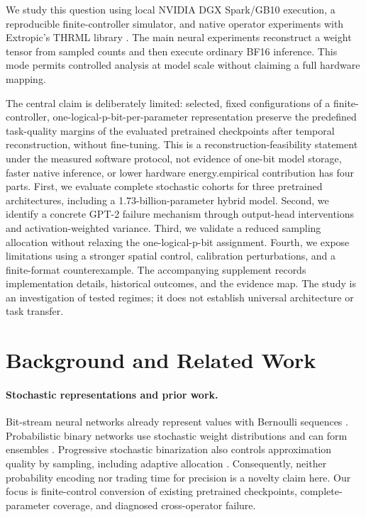 \documentclass[11pt]{article}
\begin{document}
We study this question using local NVIDIA DGX Spark/GB10 execution, a reproducible finite-controller simulator, and native operator experiments with Extropic's THRML library \citep{thrml}. The main neural experiments reconstruct a weight tensor from sampled counts and then execute ordinary BF16 inference. This mode permits controlled analysis at model scale without claiming a full hardware mapping.

The central claim is deliberately limited: selected, fixed configurations of a finite-controller, one-logical-p-bit-per-parameter representation preserve the predefined task-quality margins of the evaluated pretrained checkpoints after temporal reconstruction, without fine-tuning. This is a reconstruction-feasibility statement under the measured software protocol, not evidence of one-bit model storage, faster native inference, or lower hardware energy.\n\nThe empirical contribution has four parts. First, we evaluate complete stochastic cohorts for three pretrained architectures, including a 1.73-billion-parameter hybrid model. Second, we identify a concrete GPT-2 failure mechanism through output-head interventions and activation-weighted variance. Third, we validate a reduced sampling allocation without relaxing the one-logical-p-bit assignment. Fourth, we expose limitations using a stronger spatial control, calibration perturbations, and a finite-format counterexample. The accompanying supplement records implementation details, historical outcomes, and the evidence map. The study is an investigation of tested regimes; it does not establish universal architecture or task transfer.

\section{Background and Related Work}
\paragraph{Stochastic representations and prior work.}
Bit-stream neural networks already represent values with Bernoulli sequences \citep{shawe1995}. Probabilistic binary networks use stochastic weight distributions and can form ensembles \citep{peters2018}. Progressive stochastic binarization also controls approximation quality by sampling, including adaptive allocation \citep{hartmann2019}. Consequently, neither probability encoding nor trading time for precision is a novelty claim here. Our focus is finite-control conversion of existing pretrained checkpoints, complete-parameter coverage, and diagnosed cross-operator failure.
\end{document}
